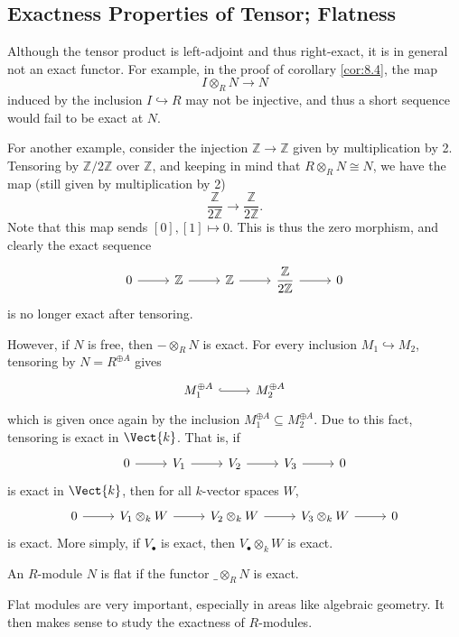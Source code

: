 \subsection{Exactness Properties of Tensor; Flatness}
Although the tensor product is left-adjoint and thus right-exact, it is in general not an exact functor. For example, in the proof of corollary \ref{cor:8.4}, the map
\[
	I\otimes_R N\to N
\]
induced by the inclusion $I\hookrightarrow R$ may not be injective, and thus a short sequence would fail to be exact at $N$.

For another example, consider the injection $\mathbb{Z} \to \mathbb{Z} $ given by multiplication by 2. Tensoring by $\mathbb{Z} /2\mathbb{Z} $ over $\mathbb{Z} $, and keeping in mind that $R\otimes_R N\cong N$, we have the map (still given by multiplication by 2)
\[
	\frac{\mathbb{Z} }{2\mathbb{Z} } \to \frac{\mathbb{Z} }{2\mathbb{Z} } 
.\]
Note that this map sends $[0],[1]\mapsto 0$. This is thus the zero morphism, and clearly the exact sequence
\[\begin{tikzcd}[row sep = 2.5em, column sep = 2.5em]
	0\arrow[r]&\mathbb{Z} \arrow[r]&\mathbb{Z} \arrow[r]&\displaystyle{\frac{\mathbb{Z} }{2\mathbb{Z} }} \arrow[r]&0
\end{tikzcd}\]
is no longer exact after tensoring.

However, if $N$ is free, then $-\otimes_R N$ is exact. For every inclusion $M_1\hookrightarrow M_2$, tensoring by $N=R^{\oplus A} $ gives
\[\begin{tikzcd}[row sep = 2.5em, column sep = 2.5em]
	M_1^{\oplus A} \arrow[r, hook]&M_2^{\oplus A} 
\end{tikzcd}\]
which is given once again by the inclusion $M_1^{\oplus A} \subseteq M_2^{\oplus A} $. Due to this fact, tensoring is exact in $\Vect{k} $. That is, if
\[\begin{tikzcd}[row sep = 2.5em, column sep = 2.5em]
	0\arrow[r]&V_1\arrow[r]&V_2\arrow[r]&V_3\arrow[r]&0
\end{tikzcd}\]
is exact in $\Vect{k} $, then for all $k$-vector spaces $W$,
\[\begin{tikzcd}[row sep = 2.5em, column sep = 2.5em]
	0\arrow[r]&V_1\otimes_k W\arrow[r]&V_2\otimes_k W\arrow[r]&V_3\otimes_k W\arrow[r]&0
\end{tikzcd}\]
is exact. More simply, if $V_\bullet $ is exact, then $V_\bullet \otimes_k W$ is exact.
\begin{definition}[Flat]\label{dfn:8.10}
	An $R$-module $N$ is flat if the functor $\_\otimes_R N$ is exact.
\end{definition}
Flat modules are very important, especially in areas like algebraic geometry. It then makes sense to study the exactness of $R$-modules.

